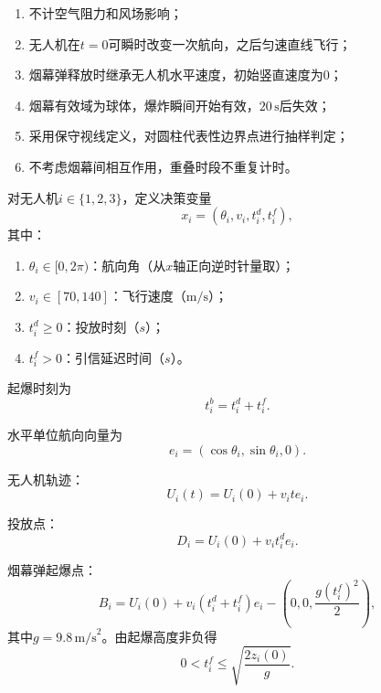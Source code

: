 \documentclass[12pt,a4paper]{article}
\begin{document}
	\begin{enumerate}[label=(\arabic*)]
		\item 不计空气阻力和风场影响；
		\item 无人机在$t=0$可瞬时改变一次航向，之后匀速直线飞行；
		\item 烟幕弹释放时继承无人机水平速度，初始竖直速度为0；
		\item 烟幕有效域为球体，爆炸瞬间开始有效，$20\,\text{s}$后失效；
		\item 采用保守视线定义，对圆柱代表性边界点进行抽样判定；
		\item 不考虑烟幕间相互作用，重叠时段不重复计时。
	\end{enumerate}
	
	
	
	对无人机$i\in\{1,2,3\}$，定义决策变量
	\begin{equation}
		x_i=(\theta_i,v_i,t_i^d,t_i^f),
	\end{equation}
	其中：
	\begin{enumerate}[label=(\arabic*)]
		\item $\theta_i\in[0,2\pi)$：航向角（从$x$轴正向逆时针量取）；
		\item $v_i\in[70,140]$：飞行速度（$\text{m/s}$）；
		\item $t_i^d\geq0$：投放时刻（$s$）；
		\item $t_i^f>0$：引信延迟时间（$s$）。
	\end{enumerate}
	
	起爆时刻为
	\begin{equation}
		t_i^b=t_i^d+t_i^f.
	\end{equation}
	
	
	水平单位航向向量为
	\begin{equation}
		e_i=(\cos\theta_i,\sin\theta_i,0).
	\end{equation}
	
	无人机轨迹：
	\begin{equation}
		U_i(t)=U_i(0)+v_i t e_i.
	\end{equation}
	
	投放点：
	\begin{equation}
		D_i=U_i(0)+v_i t_i^d e_i.
	\end{equation}
	
	烟幕弹起爆点：
	\begin{equation}
		B_i=U_i(0)+v_i(t_i^d+t_i^f)e_i-\left(0,0,\frac{g(t_i^f)^2}{2}\right),
	\end{equation}
	其中$g=9.8\,\text{m/s}^2$。由起爆高度非负得
	\begin{equation}
		0<t_i^f\leq\sqrt{\frac{2z_i(0)}{g}}.
	\end{equation}
	
\end{document}
